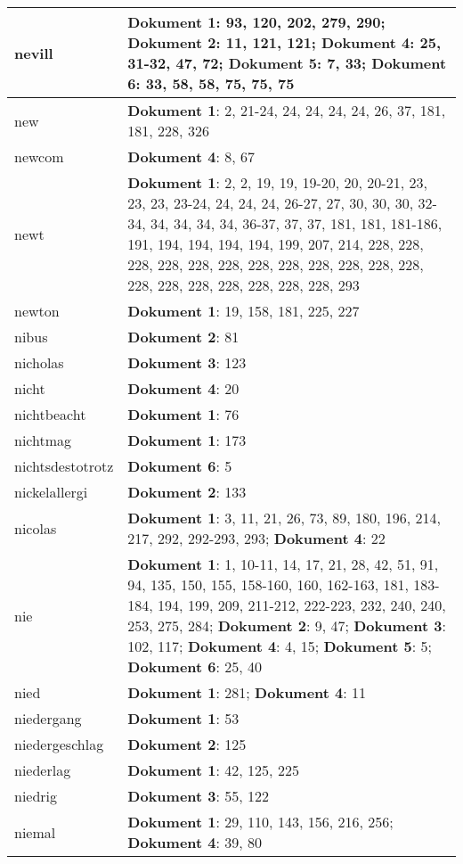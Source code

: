 \documentclass[a5paper]{article}
\begin{document}
\begin{longtable}[l]{|l|p{3in}|}
\hline
nevill & \textbf{Dokument 1}: 93, 120, 202, 279, 290; \textbf{Dokument 2}: 11, 121, 121; \textbf{Dokument 4}: 25, 31-32, 47, 72; \textbf{Dokument 5}: 7, 33; \textbf{Dokument 6}: 33, 58, 58, 75, 75, 75 \\
\hline
new & \textbf{Dokument 1}: 2, 21-24, 24, 24, 24, 24, 26, 37, 181, 181, 228, 326 \\
\hline
newcom & \textbf{Dokument 4}: 8, 67 \\
\hline
newt & \textbf{Dokument 1}: 2, 2, 19, 19, 19-20, 20, 20-21, 23, 23, 23, 23-24, 24, 24, 24, 26-27, 27, 30, 30, 30, 32-34, 34, 34, 34, 34, 36-37, 37, 37, 181, 181, 181-186, 191, 194, 194, 194, 194, 199, 207, 214, 228, 228, 228, 228, 228, 228, 228, 228, 228, 228, 228, 228, 228, 228, 228, 228, 228, 228, 228, 293 \\
\hline
newton & \textbf{Dokument 1}: 19, 158, 181, 225, 227 \\
\hline
nibus & \textbf{Dokument 2}: 81 \\
\hline
nicholas & \textbf{Dokument 3}: 123 \\
\hline
nicht & \textbf{Dokument 4}: 20 \\
\hline
nichtbeacht & \textbf{Dokument 1}: 76 \\
\hline
nichtmag & \textbf{Dokument 1}: 173 \\
\hline
nichtsdestotrotz & \textbf{Dokument 6}: 5 \\
\hline
nickelallergi & \textbf{Dokument 2}: 133 \\
\hline
nicolas & \textbf{Dokument 1}: 3, 11, 21, 26, 73, 89, 180, 196, 214, 217, 292, 292-293, 293; \textbf{Dokument 4}: 22 \\
\hline
nie & \textbf{Dokument 1}: 1, 10-11, 14, 17, 21, 28, 42, 51, 91, 94, 135, 150, 155, 158-160, 160, 162-163, 181, 183-184, 194, 199, 209, 211-212, 222-223, 232, 240, 240, 253, 275, 284; \textbf{Dokument 2}: 9, 47; \textbf{Dokument 3}: 102, 117; \textbf{Dokument 4}: 4, 15; \textbf{Dokument 5}: 5; \textbf{Dokument 6}: 25, 40 \\
\hline
nied & \textbf{Dokument 1}: 281; \textbf{Dokument 4}: 11 \\
\hline
niedergang & \textbf{Dokument 1}: 53 \\
\hline
niedergeschlag & \textbf{Dokument 2}: 125 \\
\hline
niederlag & \textbf{Dokument 1}: 42, 125, 225 \\
\hline
niedrig & \textbf{Dokument 3}: 55, 122 \\
\hline
niemal & \textbf{Dokument 1}: 29, 110, 143, 156, 216, 256; \textbf{Dokument 4}: 39, 80 \\

\end{longtable}
\end{document}
